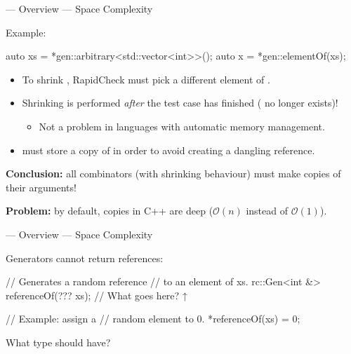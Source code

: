 \begin{frame}[fragile]{\halcheck{} --- Overview --- Space Complexity}
  \begin{block}{Example:}
    \begin{cppcode}
      auto xs = *gen::arbitrary<std::vector<int>>();
      auto x  = *gen::elementOf(xs);
    \end{cppcode}
  \end{block}

  \pause{}

  \begin{itemize}
    \item To shrink , RapidCheck must pick a different element of .
          \pause{}

    \item Shrinking is performed \emph{after} the test case has finished (\alert{ no longer exists})!
          \begin{itemize}
            \item Not a problem in languages with automatic memory management.
          \end{itemize}
          \pause{}

    \item {} must store a copy of  in order to avoid creating a dangling reference.
          \pause{}
  \end{itemize}

  \textbf{Conclusion:} all combinators (with shrinking behaviour) must make copies of their arguments!

  \pause{}

  \textbf{Problem:} by default, copies in C++ are deep ($\mathcal{O}(n)$ instead of $\mathcal{O}(1)$).
\end{frame}

\begin{frame}[fragile]{\halcheck{} --- Overview --- Space Complexity}
  \begin{block}{Generators cannot return references:}
    \begin{cppcode}
      // Generates a random reference
      // to an element of xs.
      rc::Gen<int &> referenceOf(??? xs);
      //          What goes here? ↑

      // Example: assign a
      // random element to 0.
      *referenceOf(xs) = 0;
    \end{cppcode}

    What type should  have?
  \end{block}
\end{frame}

